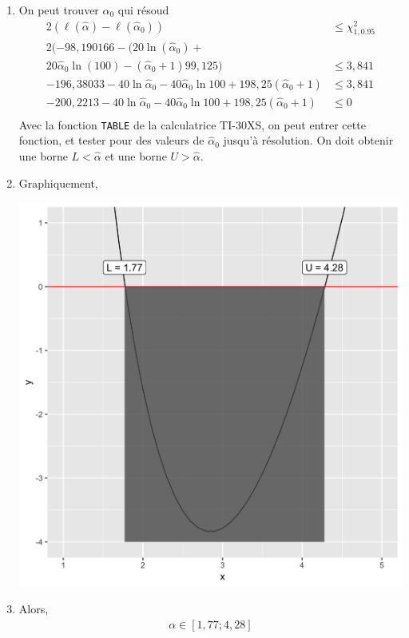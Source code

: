 \documentclass[12pt, french]{report}
\begin{document}
\begin{exemple}
\begin{enumerate}[label=(\arabic*)]
\item On peut trouver $\hat{\alpha}_0$ qui résoud
\begin{align*}
2 (\ell(\hat{\alpha}) - \ell(\hat{\alpha}_0)) & \leq \chi_{1, 0.95}^2 \\
2 (-98,190166 - \big( 20 \ln (\hat{\alpha}_0) + & \\ 
20 \hat{\alpha}_0  \ln (100) - (\hat{\alpha}_0 + 1) 99,125 \Big) & \leq 3,841 \\
-196,38033 - 40 \ln \hat{\alpha}_0 - 40 \hat{\alpha}_0 \ln 100 + 198,25 (\hat{\alpha}_0 + 1) &  \leq 3,841\\
-200,2213- 40 \ln \hat{\alpha}_0 - 40 \hat{\alpha}_0 \ln 100 + 198,25 (\hat{\alpha}_0 + 1) &  \leq 0 \\
\end{align*}
Avec la fonction \texttt{TABLE} de la calculatrice TI-30XS, on peut entrer cette fonction, et tester pour des valeurs de $\hat{\alpha}_0$ jusqu'à résolution. On doit obtenir une borne $L < \hat{\alpha}$ et une borne $U > \hat{\alpha}$.

\item Graphiquement,
\begin{center}
\includegraphics[scale=0.1]{Figures/Q13-57_visualisation.png}
\end{center}

\item Alors,
\begin{align*}
\alpha \in \left[ 1,77 ; 4,28 \right]
\end{align*}
\end{enumerate}
\end{exemple}
\end{document}
